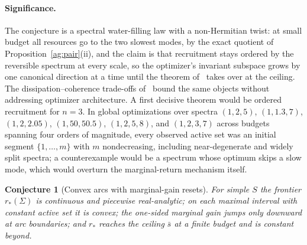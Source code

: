 \documentclass[11pt]{article}
\newtheorem{conjecture}{Conjecture}
\theoremstyle{definition}
\begin{document}
\paragraph{Significance.}
The conjecture is a spectral water-filling law with a non-Hermitian twist: at small budget all resources go to the two slowest modes, by the exact quotient of Proposition~\ref{ag:pair}(ii), and the claim is that recruitment stays ordered by the reversible spectrum at every scale, so the optimizer's invariant subspace grows by one canonical direction at a time until the theorem of~\cite{LNP13} takes over at the ceiling.  The dissipation--coherence trade-offs of~\cite{NKI26} bound the same objects without addressing optimizer architecture.  A first decisive theorem would be ordered recruitment for $n=3$.  In global optimizations over spectra $(1,2,5)$, $(1,1.3,7)$, $(1,2,2.05)$, $(1,50,50.5)$, $(1,2,5,8)$, and $(1,2,3,7)$ across budgets spanning four orders of magnitude, every observed active set was an initial segment $\{1,\ldots,m\}$ with $m$ nondecreasing, including near-degenerate and widely split spectra; a counterexample would be a spectrum whose optimum skips a slow mode, which would overturn the marginal-return mechanism itself.

\begin{conjecture}[Convex arcs with marginal-gain resets]\label{ag3}
For simple $S$ the frontier $r_*(\Sigma)$ is continuous and piecewise real-analytic; on each maximal interval with constant active set it is convex; the one-sided marginal gain jumps only downward at arc boundaries; and $r_*$ reaches the ceiling $\bar s$ at a finite budget and is constant beyond.
\end{conjecture}
\end{document}
